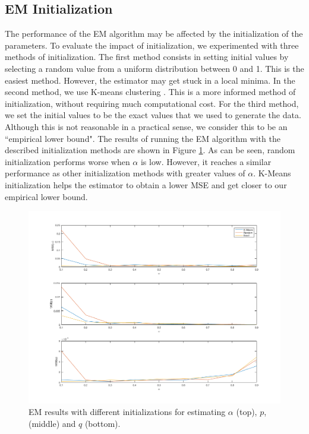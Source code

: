 \subsection{EM Initialization}

The performance of the EM algorithm may be affected by the initialization of the parameters. 
To evaluate the impact of initialization, we experimented with three methods of initialization.
The first method consists in setting initial values by selecting a random value from a uniform distribution between 0 and 1. This is the easiest method. However, the estimator may get stuck in a local minima.
In the second method, we use K-means clustering \cite{DBLP:journals/corr/BlomerB13}. This is a more informed method of initialization, without requiring much computational cost.
For the third method, we set the initial values to be the exact values that we used to generate the data. Although this is not reasonable in a practical sense, we consider this to be an ``empirical lower bound".
The results of running the EM algorithm with the described initialization methods are shown in Figure \ref{figure:em-init}. 
As can be seen, random initialization performs worse when $\alpha$ is low. 
However, it reaches a similar performance as other initialization methods with greater values of $\alpha$. 
K-Means initialization helps the estimator to obtain a lower MSE and get closer to our empirical lower bound.


\begin{figure}[!htbp]
	\centering
	\includegraphics[width=\columnwidth]{images/compare_EM_init.png}
	\caption{EM results with different initializations for estimating $\alpha$ (top), $p$, (middle) and $q$ (bottom).}
	\label{figure:em-init}
\end{figure}

